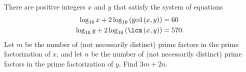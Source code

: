 There are positive integers $x$ and $y$ that satisfy the system of equations
\begin{align*}
	\log_{10}x+2\log_{10}\left(\gcd\left(x,y\right)\right)&=60\\
	\log_{10}y+2\log_{10}\left(\lcm\left(x,y\right)\right)&=570.
\end{align*}
Let $m$ be the number of (not necessarily distinct) prime factors in the prime factorization of $x$, and let $n$ be the number of (not necessarily distinct) prime factors in the prime factorization of $y$. Find $3m+2n$.